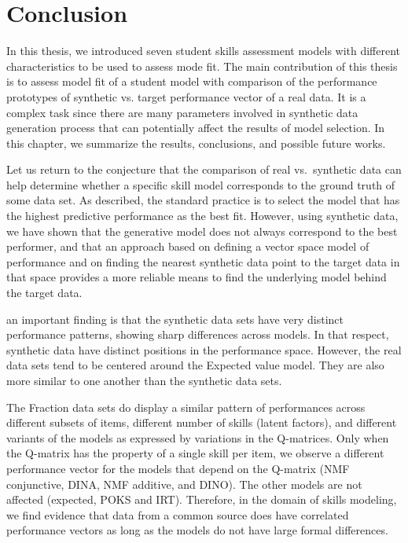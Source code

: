 \label{sec:Conclusion}

\section{Conclusion}
In this thesis, we introduced seven student skills assessment models with different characteristics to be used to assess mode fit. The main contribution of this thesis is to assess model fit of a student model with comparison of the performance prototypes of synthetic vs. target performance vector of a real data. It is a complex task since there are many parameters involved in synthetic data generation process that can potentially affect the results of model selection. In this chapter, we summarize the results, conclusions, and possible future works.


Let us return to the conjecture that the comparison of real vs.\ synthetic data can help determine whether a specific skill model corresponds to the ground truth of some data set. As described, the standard practice is to select the model that has the highest predictive performance as the best fit.  However, using synthetic data, we have shown that the generative model does not always correspond to the best performer, and that an approach based on defining a vector space model of performance and on finding the nearest synthetic data point to the target data in that space provides a more reliable means to find the underlying model behind the target data.

an important finding is that the synthetic data sets have very distinct performance patterns, showing sharp differences across models.  In that respect, synthetic data have distinct positions in the performance space. However, the real data sets tend to be centered around the Expected value model.  They are also more similar to one another than the synthetic data sets.



The Fraction data sets do display a similar pattern of performances across different subsets of items, different number of skills (latent factors), and different variants of the models as expressed by variations in the Q-matrices. Only when the Q-matrix has the property of a single skill per item, we observe a different performance vector for the models that depend on the Q-matrix (NMF conjunctive, DINA, NMF additive, and DINO).  The other models are not affected (expected, POKS and IRT).  Therefore, in the domain of skills modeling, we find evidence that data from a common source does have correlated performance vectors as long as the models do not have large formal differences.


